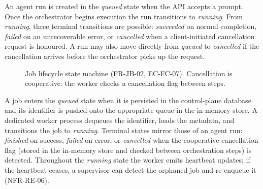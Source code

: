 \documentclass[a4paper]{sapthesis}
\begin{document}
An agent run is created in the \emph{queued} state when the API
accepts a prompt.  Once the orchestrator begins execution the run
transitions to \emph{running}.  From \emph{running}, three terminal
transitions are possible: \emph{succeeded} on normal completion,
\emph{failed} on an unrecoverable error, or \emph{cancelled} when a
client-initiated cancellation request is honoured.  A run may also move
directly from \emph{queued} to \emph{cancelled} if the cancellation
arrives before the orchestrator picks up the request.

\begin{figure}[ht]
\centering
{}
\caption{Job lifecycle state machine (FR-JB-02, EC-FC-07).
    Cancellation is cooperative: the worker checks a cancellation flag between steps.}
\label{fig:job-sm}
\end{figure}

A job enters the \emph{queued} state when it is persisted in the
control-plane database and its identifier is pushed onto the
appropriate queue in the in-memory store.  A dedicated worker process
dequeues the identifier, loads the metadata, and transitions the job to
\emph{running}.  Terminal states mirror those of an agent run:
\emph{finished} on success, \emph{failed} on error, or
\emph{cancelled} when the cooperative cancellation flag (stored in the
in-memory store and checked between orchestration steps) is detected.
Throughout the \emph{running} state the worker emits heartbeat updates;
if the heartbeat ceases, a supervisor can detect the orphaned job and
re-enqueue it (NFR-RE-06).


\end{document}
